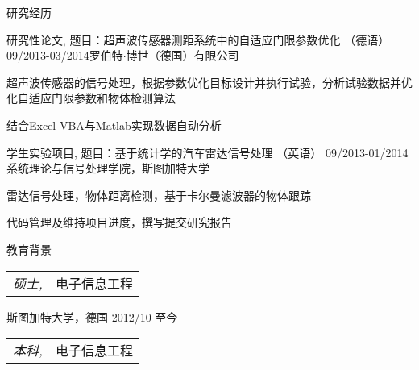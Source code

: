 \documentclass{resume} %
\begin{document}
\begin{CJK*}{UTF8}{gbsn}
\begin{rSection}{研究经历}

\begin{rSubsection}{研究性论文, 题目：超声波传感器测距系统中的自适应门限参数优化 （德语）}{09/2013-03/2014}{罗伯特$\cdot$博世（德国）有限公司}{}
\item 超声波传感器的信号处理，根据参数优化目标设计并执行试验，分析试验数据并优化自适应门限参数和物体检测算法
\item 结合Excel-VBA与Matlab实现数据自动分析
\end{rSubsection}


\begin{rSubsection}{学生实验项目, 题目：基于统计学的汽车雷达信号处理 （英语）
}{09/2013-01/2014}{系统理论与信号处理学院，斯图加特大学}{}

\item 雷达信号处理，物体距离检测，基于卡尔曼滤波器的物体跟踪
\item 代码管理及维持项目进度，撰写提交研究报告

\end{rSubsection}

% 
% 
\end{rSection}


\begin{rSection}{教育背景}
\begin{tabular}{l l}
 
{\sl 硕士,} & 电子信息工程\\
\end{tabular}

斯图加特大学，德国 \hfill 2012/10 至今\\

\begin{tabular}{l l}
{\sl 本科,} & 电子信息工程\\
\end{tabular}


\end{rSection}
\end{CJK*}
\end{document}
